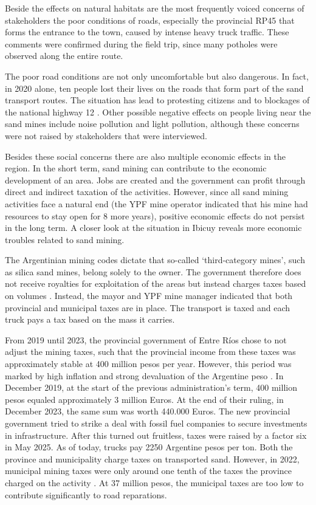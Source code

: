 Beside the effects on natural habitats are the most frequently voiced concerns of stakeholders the poor conditions of roads, especially the provincial RP45 that forms the entrance to the town, caused by intense heavy truck traffic. These comments were confirmed during the field trip, since many potholes were observed along the entire route.

The poor road conditions are not only uncomfortable but also dangerous. In fact, in 2020 alone, ten people lost their lives on the roads that form part of the sand transport routes. The situation has lead to protesting citizens and to blockages of the national highway 12 \autocite{novasImpactoAmbientalOculto2022}.
Other possible negative effects on people living near the sand mines include noise pollution and light pollution, although these concerns were not raised by stakeholders that were interviewed. 

Besides these social concerns there are also multiple economic effects in the region. In the short term, sand mining can contribute to the economic development of an area. Jobs are created and the government can profit through direct and indirect taxation of the activities. However, since all sand mining activities face a natural end (the YPF mine operator indicated that his mine had resources to stay open for 8 more years), positive economic effects do not persist in the long term. A closer look at the situation in Ibicuy reveals more economic troubles related to sand mining.

The Argentinian mining codes dictate that so-called `third-category mines', such as silica sand mines, belong solely to the owner. The government therefore does not receive royalties for exploitation of the areas but instead charges taxes based on volumes \autocite{novasImpactoAmbientalOculto2022}. Instead, the mayor and YPF mine manager indicated that both provincial and municipal taxes are in place. The transport is taxed and each truck pays a tax based on the mass it carries.

From 2019 until 2023, the provincial government of Entre Ríos chose to not adjust the mining taxes, such that the provincial income from these taxes was approximately stable at 400 million pesos per year. However, this period was marked by high inflation and strong devaluation of the Argentine peso \autocite{bellatoEntreRiosFrigerio2025}. In December 2019, at the start of the previous administration's term, 400 million pesos equaled approximately 3 million Euros. At the end of their ruling, in December 2023, the same sum was worth 440.000 Euros. The new provincial government tried to strike a deal with fossil fuel companies to secure investments in infrastructure. After this turned out fruitless, taxes were raised by a factor six in May 2025. As of today, trucks pay 2250 Argentine pesos per ton. Both the province and municipality charge taxes on transported sand. However, in 2022, municipal mining taxes were only around one tenth of the taxes the province charged on the activity \autocite{novasImpactoAmbientalOculto2022}. At 37 million pesos, the municipal taxes are too low to contribute significantly to road reparations. 

